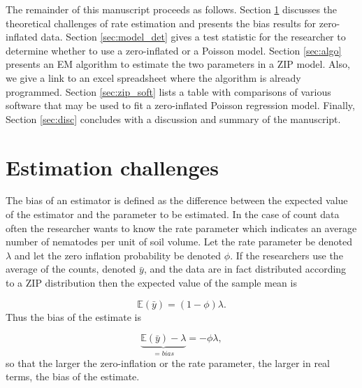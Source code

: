 \documentclass{article}
\begin{document}
The remainder of this manuscript proceeds as follows. Section \ref{sec:est} discusses the theoretical challenges of rate estimation and presents the bias results for zero-inflated data. Section \ref{sec:model_det} gives a test statistic for the researcher to determine whether to use a zero-inflated or a Poisson model. Section \ref{sec:algo} presents an EM algorithm to estimate the two parameters in a ZIP model. Also, we give a link to an excel spreadsheet where the algorithm is already programmed. Section \ref{sec:zip_soft} lists a table with comparisons of various software that may be used to fit a zero-inflated Poisson regression model. Finally, Section \ref{sec:disc} concludes with a discussion and summary of the manuscript. 

\section{Estimation challenges}\label{sec:est}

The bias of an estimator is defined as the difference between the expected value of the estimator and the parameter to be estimated. In the case of count data often the researcher wants to know the rate parameter which indicates an average number of nematodes per unit of soil volume. Let the rate parameter be denoted $\lambda$ and let the zero inflation probability be denoted $\phi$. If the researchers use the average of the counts, denoted $\bar{y}$, and the data are in fact distributed according to a ZIP distribution then the expected value of the sample mean is 

\begin{equation}\label{eqn:bias}
\mathbb{E}(\bar{y}) = (1-\phi)\lambda.
\end{equation}
Thus the bias of the estimate is 

\begin{equation}
\underbrace{\mathbb{E}(\bar{y}) - \lambda}_{=bias} = -\phi\lambda,
\end{equation}
so that the larger the zero-inflation or the rate parameter, the larger in real terms, the bias of the estimate. 
\end{document}
